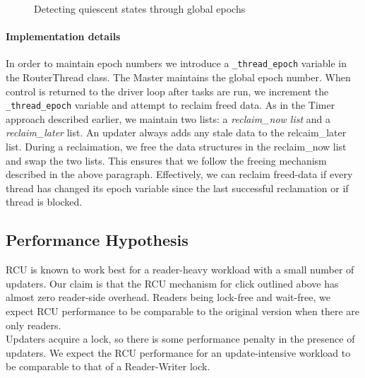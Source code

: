 \documentclass[a4paper,marginparwidth=50pt,marginparsep=10pt]{article}
\begin{document}
\begin{figure}[tph]
\label{rcufigure}
\caption{Detecting quiescent states through global epochs}
\end{figure}

\paragraph{Implementation details}
In order to maintain epoch numbers we introduce a \verb+_thread_epoch+ variable in the RouterThread class. The Master maintains the global epoch number. When control is returned to the driver loop after tasks are run, we increment the \verb+_thread_epoch+ variable and attempt to reclaim freed data. As in the Timer approach described earlier, we maintain two lists: a \emph{reclaim\_now list} and a \emph{reclaim\_later} list. An updater always adds any stale data to the relcaim\_later list. During a reclaimation, we free the data structures in the reclaim\_now list and swap the two lists. This ensures that we follow the freeing mechanism described in the above paragraph. Effectively, we can reclaim freed-data if every thread has changed its epoch variable since the last successful reclamation or if thread is blocked.
\subsection{Performance Hypothesis}
\label{sec:perfhypothesis}
RCU is known to work best for a reader-heavy workload with a small number of updaters. Our claim is that the RCU mechanism for click outlined above has almost zero reader-side overhead. Readers being lock-free and wait-free, we expect RCU performance to be comparable to the original version when there are only readers.\\

Updaters acquire a lock, so there is some performance penalty in the presence of updaters. We expect the RCU performance for an update-intensive workload to be comparable to that of a Reader-Writer lock.
\end{document}
